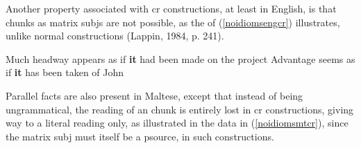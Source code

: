 \documentclass[output=paper]{LSP/langsci}
\begin{document}
Another property associated with {\sc cr} constructions, at least in English, is that  chunks as matrix {\sc subj}s are not possible, as the  of (\ref{noidiomsengcr}) illustrates, unlike normal  constructions (Lappin, 1984, p. 241). 

\ea \label{noidiomsengcr}
\ea *Much headway appears as if {\bf{it}} had been made on the project
\ex *Advantage seems as if {\bf{it}} has been taken of John
\z
\z

Parallel facts are also present in Maltese, except that instead of being ungrammatical, the  reading of an  chunk is entirely lost in {\sc cr} constructions, giving way to a literal reading only, as illustrated in the data in (\ref{noidiomsmtcr}), since the matrix {\sc subj} must itself be a {\sc psource}, in such constructions. %
\end{document}
